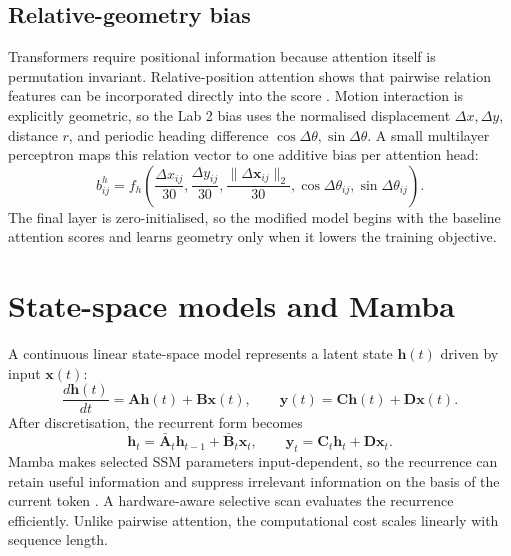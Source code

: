 \subsection{Relative-geometry bias}

Transformers require positional information because attention itself is permutation invariant. Relative-position attention shows that pairwise relation features can be incorporated directly into the score \cite{shaw2018relative}. Motion interaction is explicitly geometric, so the Lab 2 bias uses the normalised displacement $\Delta x,\Delta y$, distance $r$, and periodic heading difference $\cos\Delta\theta,\sin\Delta\theta$. A small multilayer perceptron maps this relation vector to one additive bias per attention head:
\begin{equation}
    b_{ij}^{h}=f_h\left(
    \frac{\Delta x_{ij}}{30},
    \frac{\Delta y_{ij}}{30},
    \frac{\lVert\Delta\mathbf{x}_{ij}\rVert_2}{30},
    \cos\Delta\theta_{ij},
    \sin\Delta\theta_{ij}
    \right).
    \label{eq:geometrybias}
\end{equation}
The final layer is zero-initialised, so the modified model begins with the baseline attention scores and learns geometry only when it lowers the training objective.

\section{State-space models and Mamba}

A continuous linear state-space model represents a latent state $\mathbf{h}(t)$ driven by input $\mathbf{x}(t)$:
\begin{equation}
    \frac{d\mathbf{h}(t)}{dt}=\mathbf{A}\mathbf{h}(t)+\mathbf{B}\mathbf{x}(t),
    \qquad
    \mathbf{y}(t)=\mathbf{C}\mathbf{h}(t)+\mathbf{D}\mathbf{x}(t).
\end{equation}
After discretisation, the recurrent form becomes
\begin{equation}
    \mathbf{h}_{t}=\bar{\mathbf{A}}_{t}\mathbf{h}_{t-1}+\bar{\mathbf{B}}_{t}\mathbf{x}_{t},
    \qquad
    \mathbf{y}_{t}=\mathbf{C}_{t}\mathbf{h}_{t}+\mathbf{D}\mathbf{x}_{t}.
    \label{eq:ssm}
\end{equation}
Mamba makes selected SSM parameters input-dependent, so the recurrence can retain useful information and suppress irrelevant information on the basis of the current token \cite{gu2024mamba}. A hardware-aware selective scan evaluates the recurrence efficiently. Unlike pairwise attention, the computational cost scales linearly with sequence length.

